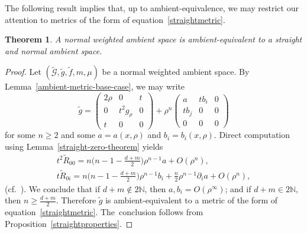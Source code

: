 \documentclass[11pt]{article}
\numberwithin{equation}{section}
\numberwithin{equation}{section}
\newtheorem{Theorem}{Theorem}[section]
\begin{document}
The following result implies that, up to ambient-equivalence, we may restrict our attention to metrics of the form of equation~\eqref{straightmetric}.
\begin{Theorem}
\label{normal-to-straight-and-normal}
A normal weighted ambient space is ambient-equivalent to a straight and normal ambient space.
\end{Theorem}
\begin{proof}
Let $(\widetilde{\mathcal{G}},\widetilde{g},\widetilde{f},m,\mu)$ be a normal weighted ambient space. By Lemma~\ref{ambient-metric-base-case}, we may write
\[
\widetilde{g}=\begin{pmatrix} 2\rho&0&t\\0&t^2 g_\rho& 0\\ t&0&0\end{pmatrix}+\rho^n \begin{pmatrix} a& tb_i& 0\\ tb_j & 0 & 0\\ 0&0&0\end{pmatrix}
\]
for some $n\geq 2$ and some $a=a(x,\rho)$ and $b_i=b_i(x,\rho)$. Direct computation using Lemma~\ref{straight-zero-theorem} yields
\begin{gather*}
t^{2} \widetilde{R}_{00}=n\bigg(n-1-\frac{d+m}{2}\bigg) \rho^{n-1} a+O(\rho^{n}),
\\
t \widetilde{R}_{0 i}=n\bigg(n-1-\frac{d+m}{2}\bigg) \rho^{n-1} b_i+\frac{n}{2} \rho^{n-1} \partial_{i} a+O(\rho^{n}),
\end{gather*}
(cf.\ \cite[equation~(3.11)]{FeffermanGraham2012}).
We conclude that if $d+m\notin 2\mathbb{N}$, then $a,b_i=O(\rho^\infty)$; and if $d+m\in 2\mathbb{N}$, then $n\geq \frac{d+m}{2}$. Therefore $\widetilde{g}$ is ambient-equivalent to a metric of the form of equation~\eqref{straightmetric}. The~conclusion follows from Proposition~\ref{straightproperties}.
\end{proof}
\end{document}
